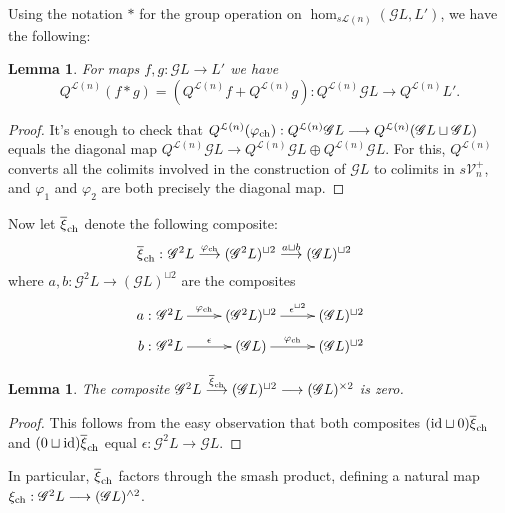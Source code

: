 \documentclass[11pt]{amsart}
\theoremstyle{plain}
\newtheorem{lem}[thm]{Lemma}
\theoremstyle{definition}
\let\phi\varphi
\renewcommand{\to}{\longrightarrow}
\newcommand{\scrQ}{\mathscr{Q}}
\newcommand{\scrR}{\mathscr{R}}
\newcommand{\scrT}{\mathscr{T}}
\newcommand{\scrY}{\mathscr{Y}}
\newcommand{\scrI}{\mathscr{I}}
\newcommand{\scrO}{\mathscr{O}}
\newcommand{\scrP}{\mathscr{P}}
\newcommand{\scrS}{\mathscr{S}}
\newcommand{\scrG}{\mathscr{G}}
\newcommand{\scrH}{\mathscr{H}}
\newcommand{\scrJ}{\mathscr{J}}
\newcommand{\scrK}{\mathscr{K}}
\newcommand{\scrL}{\mathscr{L}}
\newcommand{\scrZ}{\mathscr{Z}}
\newcommand{\scrN}{\mathscr{N}}
\newcommand{\scrM}{\mathscr{M}}
\newcommand{\calL}{\mathcal{L}}
\newcommand{\calV}{\mathcal{V}}
\theoremstyle{plain}
\newcommand{\vect}[2]{\calV^{#1}_{#2}}
\newcommand{\BSW}{{\scrG}}%
\begin{document}
\begin{comp func sseq old version}
\begin{shaded}
Using the notation $*$ for the group operation on $\hom_{s\calL(n)}(\BSW L,L')$, we have the following:
\begin{lem}
For maps $f,g:\BSW L\to L'$ we have 
\[Q^{\calL(n)}(f*g)=(Q^{\calL(n)}f+Q^{\calL(n)}g):Q^{\calL(n)}\BSW L\to Q^{\calL(n)}L'.\]
\end{lem}
\begin{proof}
It's enough to check that $Q^{\calL(n)}(\phi_\textup{ch}):Q^{\calL(n)}\BSW L\to Q^{\calL(n)}(\BSW L\sqcup \BSW L)$ equals the diagonal map $Q^{\calL(n)}\BSW L\to Q^{\calL(n)}\BSW L\oplus Q^{\calL(n)}\BSW L$. For this, $Q^{\calL(n)}$ converts all the colimits involved in the construction of $\BSW L$ to colimits in $s\vect{+}{n}$, and $\phi_1$ and $\phi_2$ are both precisely the diagonal map.
\end{proof}

Now let $\overline{\xi}_{\textup{ch}}$ denote the following composite:
\[\makebox[0mm][r]{$\overline{\xi}_{\textup{ch}}:\ $}\BSW^2L\overset{\phi_{\textup{ch}}}{\to}(\BSW^2L)^{\sqcup2}\overset{a\sqcup b}{\to}(\BSW L)^{\sqcup2}\]
where $a,b:\BSW^2L\to(\BSW L)^{\sqcup2}$ are the composites
\[\xymatrix@R=2mm{
\makebox[0mm][r]{$a:\ $}\BSW^2L\ar[r]^-{\phi_{\textup{ch}}}
&%
(\BSW^2L)^{\sqcup2}\ar[r]^-{\epsilon^{\sqcup2}}
&%
(\BSW L)^{\sqcup2}\\
\makebox[0mm][r]{$b:\ $}\BSW^2L\ar[r]^-{\epsilon}
&%
(\BSW L)\ar[r]^-{\phi_{\textup{ch}}}
&%
(\BSW L)^{\sqcup2}
}\]
\begin{lem}
The composite 
$\BSW^2L\overset{\overline{\xi}_{\textup{ch}}}{\to}(\BSW L)^{\sqcup2}\to(\BSW L)^{\times2}$ is zero.
\end{lem}
\begin{proof}
This follows from the easy observation that both composites $(\textup{id}\sqcup0)\overline{\xi}_{\textup{ch}}$ and $(0\sqcup\textup{id})\overline{\xi}_{\textup{ch}}$ equal $\epsilon:\BSW^2L\to \BSW L$.
\end{proof}
In particular, $\overline{\xi}_{\textup{ch}}$ factors through the smash product, defining a natural map $\xi_{\textup{ch}}:\BSW^2L\to (\BSW L)^{\wedge 2}$.


\end{shaded}
\end{comp func sseq old version}
\end{document}
